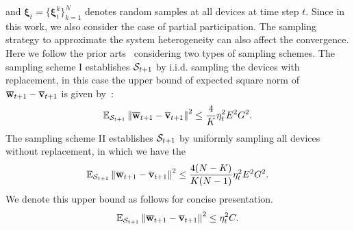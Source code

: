 and $\mathbf{\xi}_t = \{\mathbf{\xi}_t^k\}_{k=1}^N$ denotes random samples at all devices at time step $t$. 
Since in this work, we also consider the case of partial participation. The sampling
strategy to approximate the system heterogeneity can also affect the convergence. Here we
follow the prior arts~\cite{haddadpour2019convergence} considering two types of sampling
schemes. 
The sampling scheme I establishes ${\mathcal{S}}_{t+1}$ by i.i.d. sampling the devices with replacement,
in this case the upper bound of expected square norm of ${\overline{\mathbf{w}}}_{t+1} - {\overline{\mathbf{v}}}_{t+1}$ is given by~\cite[Lemma 5]{li2019convergence}:
\begin{align}
\mathbb{E}_{{\mathcal{S}}_{t+1}}\left\|{\overline{\mathbf{w}}}_{t+1} - {\overline{\mathbf{v}}}_{t+1}\right\|^2	\leq \frac{4}{K} \eta_t^2 E^2G^2.
\end{align}
The sampling scheme II establishes ${\mathcal{S}}_{t+1}$ by uniformly sampling all devices without
replacement, in which we have the 
\begin{align}
\mathbb{E}_{{\mathcal{S}}_{t+1}}\left\|{\overline{\mathbf{w}}}_{t+1} - {\overline{\mathbf{v}}}_{t+1}\right\|^2	\leq \frac{4(N - K)}{K(N-1)} \eta_t^2 E^2G^2.
\end{align}
We denote this upper bound as follows for concise presentation. 
\begin{align}
	\mathbb{E}_{{\mathcal{S}}_{t+1}}\left\|{\overline{\mathbf{w}}}_{t+1} - {\overline{\mathbf{v}}}_{t+1}\right\|^2 \leq  \eta_t^2 C.
	\label{eq:partialsample}
\end{align}